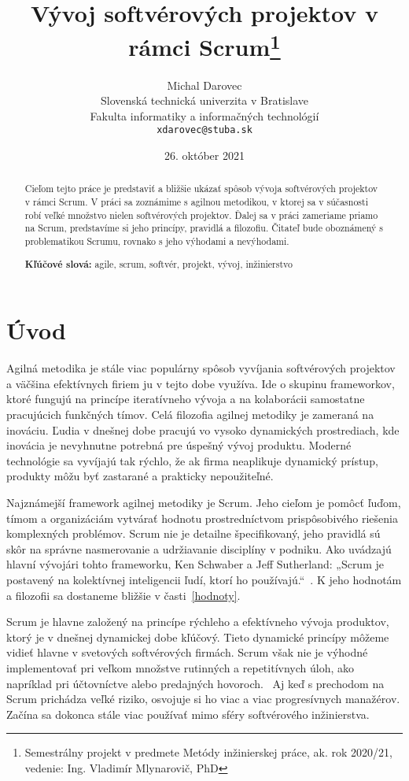 \documentclass[10pt,slovak,a4paper]{article}
\title{Vývoj softvérových projektov v rámci Scrum\thanks{Semestrálny projekt v predmete Metódy inžinierskej práce, ak. rok 2020/21, vedenie: Ing. Vladimír Mlynarovič, PhD}}
\author{Michal Darovec\\[2pt]
	{\small Slovenská technická univerzita v Bratislave}\\
	{\small Fakulta informatiky a informačných technológií}\\
	{\small \texttt{xdarovec@stuba.sk}}
	}
\date{\small 26. október 2021}
\begin{document}
\maketitle

\begin{abstract}
Cieľom tejto práce je predstaviť a bližšie ukázať spôsob vývoja softvérových projektov v rámci Scrum. V práci sa zoznámime s agilnou metodikou, v ktorej sa v súčasnosti robí veľké množstvo nielen softvérových projektov. Ďalej sa v práci zameriame priamo na Scrum, predstavíme si jeho princípy, pravidlá a filozofiu. Čitateľ bude oboznámený s problematikou Scrumu, rovnako s jeho výhodami a nevýhodami.

\textbf{Kľúčové slová:} agile, scrum, softvér, projekt, vývoj, inžinierstvo
\end{abstract}



\section{Úvod}

Agilná metodika je stále viac populárny spôsob vyvíjania softvérových projektov a väčšina efektívnych firiem ju v tejto dobe využíva. Ide o skupinu frameworkov, ktoré fungujú na princípe iteratívneho vývoja a na kolaborácii samostatne pracujúcich funkčných tímov.
Celá filozofia agilnej metodiky je zameraná na inováciu. Ľudia v dnešnej dobe pracujú vo vysoko dynamických prostrediach, kde inovácia je nevyhnutne potrebná pre úspešný vývoj produktu. Moderné technológie sa vyvíjajú tak rýchlo, že ak firma neaplikuje dynamický prístup, produkty môžu byť zastarané a prakticky nepoužiteľné.

Najznámejší framework agilnej metodiky je Scrum. Jeho cieľom je pomôcť ľuďom, tímom a organizáciám vytvárať hodnotu prostredníctvom prispôsobivého riešenia komplexných problémov. Scrum nie je detailne špecifikovaný, jeho pravidlá sú skôr na správne nasmerovanie a udržiavanie disciplíny v podniku. Ako uvádzajú hlavní vývojári tohto frameworku, Ken Schwaber a Jeff Sutherland: „Scrum je postavený na kolektívnej inteligencii ľudí, ktorí ho používajú.“~\cite{schwaber2020scrum}. K jeho hodnotám a filozofii sa dostaneme bližšie v časti~\ref{hodnoty}.

Scrum je hlavne založený na princípe rýchleho a efektívneho vývoja produktov, ktorý je v dnešnej dynamickej dobe kľúčový. Tieto dynamické princípy môžeme vidieť hlavne v svetových softvérových firmách. Scrum však nie je výhodné implementovať pri veľkom množstve rutinných a repetitívnych úloh, ako napríklad pri účtovníctve alebo predajných hovoroch.~\cite{agile} Aj keď s prechodom na Scrum prichádza veľké riziko, osvojuje si ho viac a viac progresívnych manažérov. Začína sa dokonca stále viac používať mimo sféry softvérového inžinierstva.
\end{document}
